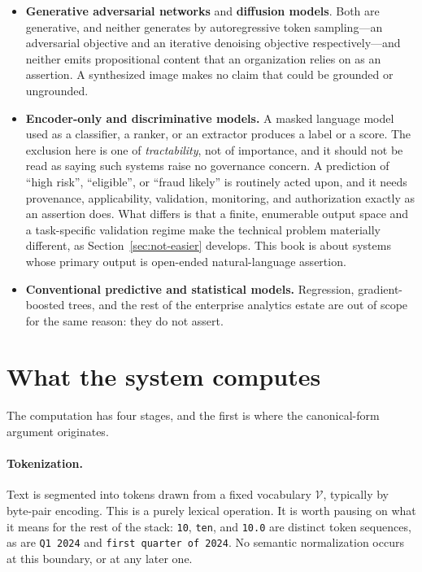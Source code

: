 \begin{itemize}
  \item \textbf{Generative adversarial networks} and \textbf{diffusion models}.
        Both are generative, and neither generates by autoregressive token
        sampling---an adversarial objective and an iterative denoising objective
        respectively---and neither emits propositional content that an
        organization relies on as an assertion. A synthesized image makes no claim
        that could be grounded or ungrounded.
  \item \textbf{Encoder-only and discriminative models.} A masked language model
        used as a classifier, a ranker, or an extractor produces a label or a score.
        The exclusion here is one of \emph{tractability}, not of importance, and it
        should not be read as saying such systems raise no governance concern. A
        prediction of ``high risk'', ``eligible'', or ``fraud likely'' is routinely
        acted upon, and it needs provenance, applicability, validation, monitoring, and
        authorization exactly as an assertion does. What differs is that a finite,
        enumerable output space and a task-specific validation regime make the
        technical problem materially different, as Section~\ref{sec:not-easier}
        develops. This book is about systems whose primary output is open-ended
        natural-language assertion.
  \item \textbf{Conventional predictive and statistical models.} Regression,
        gradient-boosted trees, and the rest of the enterprise analytics estate
        are out of scope for the same reason: they do not assert.
\end{itemize}

\section{What the system computes}
\label{sec:what-computed}

The computation has four stages, and the first is where the
canonical-form argument originates.

\paragraph{Tokenization.} Text is segmented into tokens drawn from a fixed
vocabulary $\mathcal{V}$, typically by byte-pair encoding. This is a purely
lexical operation. It is worth pausing on what it means for the rest of the stack:
\texttt{10}, \texttt{ten}, and \texttt{10.0} are distinct token sequences, as are
\texttt{Q1 2024} and \texttt{first quarter of 2024}. No semantic normalization
occurs at this boundary, or at any later one.

